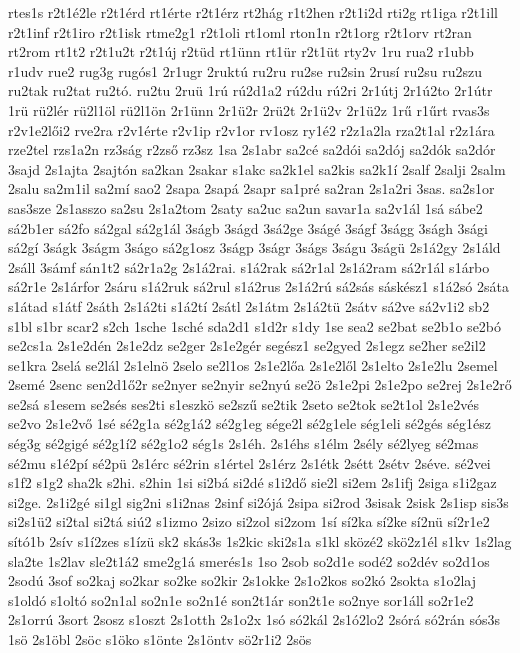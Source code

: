 {rtes1s
r2t1é2le
r2t1érd
rt1érte
r2t1érz
rt2hág
r1t2hen
r2t1i2d
rti2g
rt1iga
r2t1ill
r2t1inf
r2t1iro
r2t1isk
rtme2g1
r2t1oli
rt1oml
rton1n
r2t1org
r2t1orv
rt2ran
rt2rom
rt1t2
r2t1u2t
r2t1új
r2tüd
rt1ünn
rt1ür
r2t1üt
rty2v
1ru
rua2
r1ubb
r1udv
rue2
rug3g
rugós1
2r1ugr
2ruktú
ru2ru
ru2se
ru2sin
2rusí
ru2su
ru2szu
ru2tak
ru2tat
ru2tó.
ru2tu
2ruü
1rú
rú2d1a2
rú2du
rú2ri
2r1útj
2r1ú2to
2r1útr
1rü
rü2lér
rü2l1öl
rü2l1ön
2r1ünn
2r1ü2r
2rü2t
2r1ü2v
2r1ü2z
1rű
r1űrt
rvas3s
r2v1e2lői2
rve2ra
r2v1érte
r2v1ip
r2v1or
rv1osz
ry1é2
r2z1a2la
rza2t1al
r2z1ára
rze2tel
rzs1a2n
rz3ság
r2zső
rz3sz
1sa
2s1abr
sa2cé
sa2dói
sa2dój
sa2dók
sa2dór
3sajd
2s1ajta
2sajtón
sa2kan
2sakar
s1akc
sa2k1el
sa2kis
sa2k1í
2salf
2salji
2salm
2salu
sa2m1il
sa2mí
sao2
2sapa
2sapá
2sapr
sa1pré
sa2ran
2s1a2ri
3sas.
sa2s1or
sas3sze
2s1asszo
sa2su
2s1a2tom
2saty
sa2uc
sa2un
savar1a
sa2v1ál
1sá
sábe2
sá2b1er
sá2fo
sá2gal
sá2g1ál
3ságb
3ságd
3sá2ge
3ságé
3ságf
3ságg
3ságh
3sági
sá2gí
3ságk
3ságm
3ságo
sá2g1osz
3ságp
3ságr
3ságs
3ságu
3ságü
2s1á2gy
2s1áld
2sáll
3sámf
sán1t2
sá2r1a2g
2s1á2rai.
s1á2rak
sá2r1al
2s1á2ram
sá2r1ál
s1árbo
sá2r1e
2s1árfor
2sáru
s1á2ruk
sá2rul
s1á2rus
2s1á2rú
sá2sás
sáskész1
s1á2só
2sáta
s1átad
s1átf
2sáth
2s1á2ti
s1á2tí
2sátl
2s1átm
2s1á2tü
2sátv
sá2ve
sá2v1i2
sb2
s1bl
s1br
scar2
s2ch
1sche
1sché
sda2d1
s1d2r
s1dy
1se
sea2
se2bat
se2b1o
se2bó
se2cs1a
2s1e2dén
2s1e2dz
se2ger
2s1e2gér
segész1
se2gyed
2s1egz
se2her
se2il2
se1kra
2selá
se2lál
2s1elnö
2selo
se2l1os
2s1e2lőa
2s1e2lől
2s1elto
2s1e2lu
2semel
2semé
2senc
sen2d1ő2r
se2nyer
se2nyir
se2nyú
se2ö
2s1e2pi
2s1e2po
se2rej
2s1e2rő
se2sá
s1esem
se2sés
ses2ti
s1eszkö
se2szű
se2tik
2seto
se2tok
se2t1ol
2s1e2vés
se2vo
2s1e2vő
1sé
sé2g1a
sé2g1á2
sé2g1eg
sége2l
sé2g1ele
ség1eli
sé2gés
ség1ész
ség3g
sé2gigé
sé2g1í2
sé2g1o2
ség1s
2s1éh.
2s1éhs
s1élm
2sély
sé2lyeg
sé2mas
sé2mu
s1é2pí
sé2pü
2s1érc
sé2rin
s1értel
2s1érz
2s1étk
2sétt
2sétv
2séve.
sé2vei
s1f2
s1g2
sha2k
s2hi.
s2hin
1si
si2bá
si2dé
s1i2dő
sie2l
si2em
2s1ifj
2siga
s1i2gaz
si2ge.
2s1i2gé
si1gl
sig2ni
s1i2nas
2sinf
si2ójá
2sipa
si2rod
3sisak
2sisk
2s1isp
sis3s
si2s1ü2
si2tal
si2tá
siú2
s1izmo
2sizo
si2zol
si2zom
1sí
sí2ka
sí2ke
sí2nü
sí2r1e2
sító1b
2sív
s1í2zes
s1ízü
sk2
skás3s
1s2kic
ski2s1a
s1kl
sközé2
skö2z1él
s1kv
1s2lag
sla2te
1s2lav
sle2t1á2
sme2g1á
smerés1s
1so
2sob
so2d1e
sodé2
so2dév
so2d1os
2sodú
3sof
so2kaj
so2kar
so2ke
so2kir
2s1okke
2s1o2kos
so2kó
2sokta
s1o2laj
s1oldó
s1oltó
so2n1al
so2n1e
so2n1é
son2t1ár
son2t1e
so2nye
sor1áll
so2r1e2
2s1orrú
3sort
2sosz
s1oszt
2s1otth
2s1o2x
1só
só2kál
2s1ó2lo2
2sórá
só2rán
sós3s
1sö
2s1öbl
2söc
s1öko
s1önte
2s1öntv
sö2r1i2
2sös
}
